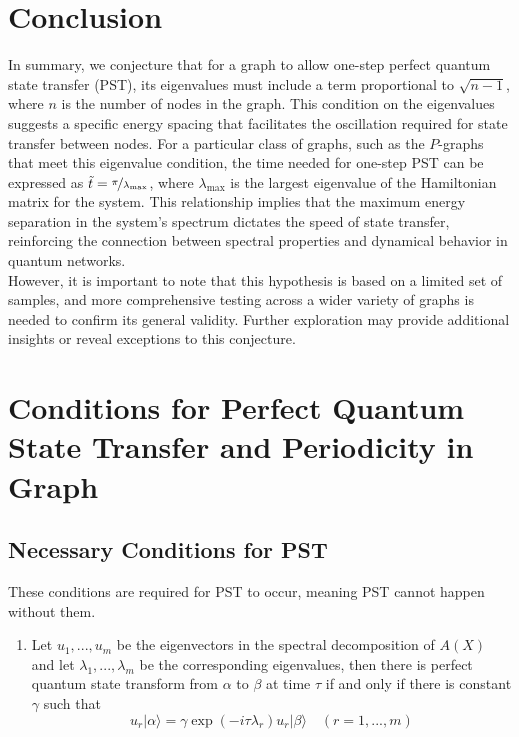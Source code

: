\documentclass[aps]{revtex4-2}
\begin{document}
\section{Conclusion}
\noindent In summary, we conjecture that for a graph to allow one-step perfect quantum state transfer (PST), its eigenvalues must include a term proportional to \( \sqrt{n - 1} \), where \( n \) is the number of nodes in the graph. This condition on the eigenvalues suggests a specific energy spacing that facilitates the oscillation required for state transfer between nodes. For a particular class of graphs, such as the \( P \)-graphs that meet this eigenvalue condition, the time needed for one-step PST can be expressed as \( \tilde{t} = \nicefrac{\pi}{\lambda_{\text{max}}} \), where \( \lambda_{\text{max}} \) is the largest eigenvalue of the Hamiltonian matrix for the system. This relationship implies that the maximum energy separation in the system's spectrum dictates the speed of state transfer, reinforcing the connection between spectral properties and dynamical behavior in quantum networks.\\
However, it is important to note that this hypothesis is based on a limited set of samples, and more comprehensive testing across a wider variety of graphs is needed to confirm its general validity. Further exploration may provide additional insights or reveal exceptions to this conjecture.
\section{Conditions for Perfect Quantum State Transfer and Periodicity in Graph}
\subsection{Necessary Conditions for PST}
These conditions are required for PST to occur, meaning PST cannot happen without them.
\begin{enumerate}
    \item Let $u_1,...,u_m$ be the eigenvectors in the spectral decomposition of $A(X)$ and let $\lambda_1,...,\lambda_m$ be the corresponding eigenvalues, then there is perfect quantum state transform from $\alpha$ to $\beta$ at time $\tau$ if and only if there is constant $\gamma$ such that
    \begin{equation}
        u_r|\alpha\rangle=\gamma\exp{(-i\tau\lambda_r)}u_r|\beta\rangle\quad(r=1,...,m)
    \end{equation}
\end{enumerate}
\end{document}
